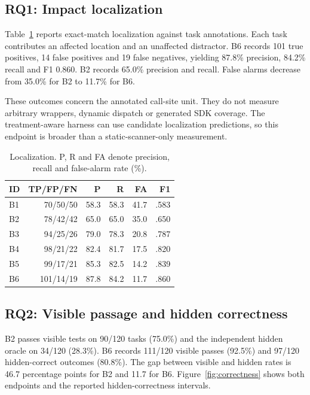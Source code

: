 \subsection{RQ1: Impact localization}
Table~\ref{tab:localization} reports exact-match localization against task annotations. Each task contributes an affected location and an unaffected distractor. B6 records 101 true positives, 14 false positives and 19 false negatives, yielding 87.8\% precision, 84.2\% recall and F1 0.860. B2 records 65.0\% precision and recall. False alarms decrease from 35.0\% for B2 to 11.7\% for B6.

These outcomes concern the annotated call-site unit. They do not measure arbitrary wrappers, dynamic dispatch or generated SDK coverage. The treatment-aware harness can use candidate localization predictions, so this endpoint is broader than a static-scanner-only measurement.

\begin{table}[t]\centering\small\setlength{\tabcolsep}{3pt}
\caption{Localization. P, R and FA denote precision, recall and false-alarm rate (\%).}\label{tab:localization}
\begin{tabular*}{\columnwidth}{@{\extracolsep{\fill}}lrrrrr@{}}\toprule
ID & TP/FP/FN & P & R & FA & F1\\\midrule
B1 & 70/50/50 & 58.3 & 58.3 & 41.7 & .583\\
B2 & 78/42/42 & 65.0 & 65.0 & 35.0 & .650\\
B3 & 94/25/26 & 79.0 & 78.3 & 20.8 & .787\\
B4 & 98/21/22 & 82.4 & 81.7 & 17.5 & .820\\
B5 & 99/17/21 & 85.3 & 82.5 & 14.2 & .839\\
B6 & 101/14/19 & 87.8 & 84.2 & 11.7 & .860\\\bottomrule
\end{tabular*}
\end{table}

\subsection{RQ2: Visible passage and hidden correctness}
B2 passes visible tests on 90/120 tasks (75.0\%) and the independent hidden oracle on 34/120 (28.3\%). B6 records 111/120 visible passes (92.5\%) and 97/120 hidden-correct outcomes (80.8\%). The gap between visible and hidden rates is 46.7 percentage points for B2 and 11.7 for B6. Figure~\ref{fig:correctness} shows both endpoints and the reported hidden-correctness intervals.

